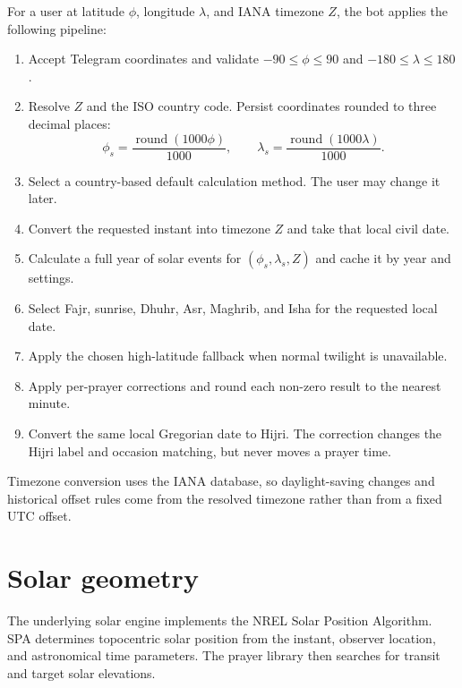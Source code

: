 \documentclass[11pt,a4paper]{article}
\begin{document}
For a user at latitude $\phi$, longitude $\lambda$, and IANA timezone $Z$, the bot applies the following pipeline:

\begin{enumerate}
  \item Accept Telegram coordinates and validate $-90\leq\phi\leq90$ and $-180\leq\lambda\leq180$.
  \item Resolve $Z$ and the ISO country code. Persist coordinates rounded to three decimal places:
  \[
    \phi_s=\frac{\operatorname{round}(1000\phi)}{1000},\qquad
    \lambda_s=\frac{\operatorname{round}(1000\lambda)}{1000}.
  \]
  \item Select a country-based default calculation method. The user may change it later.
  \item Convert the requested instant into timezone $Z$ and take that local civil date.
  \item Calculate a full year of solar events for $(\phi_s,\lambda_s,Z)$ and cache it by year and settings.
  \item Select Fajr, sunrise, Dhuhr, Asr, Maghrib, and Isha for the requested local date.
  \item Apply the chosen high-latitude fallback when normal twilight is unavailable.
  \item Apply per-prayer corrections and round each non-zero result to the nearest minute.
  \item Convert the same local Gregorian date to Hijri. The correction changes the Hijri label and occasion matching, but never moves a prayer time.
\end{enumerate}

Timezone conversion uses the IANA database, so daylight-saving changes and historical offset rules come from the resolved timezone rather than from a fixed UTC offset.

\section{Solar geometry}

The underlying solar engine implements the NREL Solar Position Algorithm. SPA determines topocentric solar position from the instant, observer location, and astronomical time parameters. The prayer library then searches for transit and target solar elevations.
\end{document}
